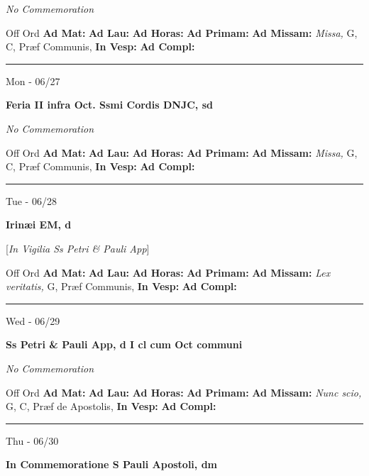 \documentclass[letterpaper, 10pt]{article}
\begin{document}
\textit{No Commemoration}\begin{justify}
Off Ord
\textbf{Ad Mat: }
\textbf{Ad Lau: }
\textbf{Ad Horas: }
\textbf{Ad Primam: }
\textbf{Ad Missam:} \textit{Missa, } G, C, Præf Communis, 
\textbf{In Vesp: }
\textbf{Ad Compl: }\end{justify}



\hrule
\begin{center}
Mon - 06/27
\end{center}\textbf{ \large Feria II infra Oct. Ssmi Cordis DNJC, \textnormal{\normalsize sd}}

\textit{No Commemoration}\begin{justify}
Off Ord
\textbf{Ad Mat: }
\textbf{Ad Lau: }
\textbf{Ad Horas: }
\textbf{Ad Primam: }
\textbf{Ad Missam:} \textit{Missa, } G, C, Præf Communis, 
\textbf{In Vesp: }
\textbf{Ad Compl: }\end{justify}



\hrule
\begin{center}
Tue - 06/28
\end{center}\textbf{ \large Irinæi EM, \textnormal{\normalsize d}}

[\textit{In Vigilia Ss Petri \& Pauli App}]
\begin{justify}
Off Ord
\textbf{Ad Mat: }
\textbf{Ad Lau: }
\textbf{Ad Horas: }
\textbf{Ad Primam: }
\textbf{Ad Missam:} \textit{Lex veritatis, } G, Præf Communis, 
\textbf{In Vesp: }
\textbf{Ad Compl: }\end{justify}



\hrule
\begin{center}
Wed - 06/29
\end{center}\textbf{ \large Ss Petri \& Pauli App, \textnormal{\normalsize d I cl cum Oct communi}}

\textit{No Commemoration}\begin{justify}
Off Ord
\textbf{Ad Mat: }
\textbf{Ad Lau: }
\textbf{Ad Horas: }
\textbf{Ad Primam: }
\textbf{Ad Missam:} \textit{Nunc scio, } G, C, Præf de Apostolis, 
\textbf{In Vesp: }
\textbf{Ad Compl: }\end{justify}



\hrule
\begin{center}
Thu - 06/30
\end{center}\textbf{ \large In Commemoratione S Pauli Apostoli, \textnormal{\normalsize dm}}
\end{document}
